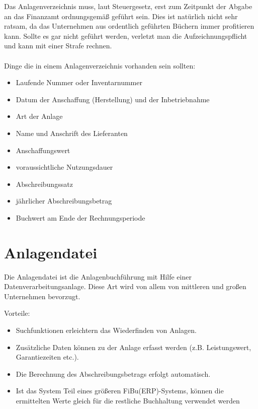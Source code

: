 \documentclass[a4paper,10pt]{report}
\begin{document}
Das Anlagenverzeichnis muss, laut Steuergesetz, erst zum Zeitpunkt der
Abgabe an das Finanzamt ordnungsgemäß geführt sein. Dies ist natürlich
nicht sehr ratsam, da das Unternehmen aus ordentlich geführten Büchern
immer profitieren kann. Sollte es gar nicht geführt werden, verletzt
man die Aufzeichnungspflicht und kann mit einer Strafe rechnen.
\\\\
Dinge die in einem Anlagenverzeichnis vorhanden sein sollten:
\begin{multicols}{2}
  \begin{itemize}
    \item Laufende Nummer oder Inventarnummer
    \item Datum der Anschaffung (Herstellung) und der Inbetriebnahme
    \item Art der Anlage
    \item Name und Anschrift des Lieferanten
    \item Anschaffungswert
    \item voraussichtliche Nutzungsdauer
    \item Abschreibungssatz
    \item jährlicher Abschreibungsbetrag
    \item Buchwert am Ende der Rechnungsperiode
  \end{itemize}
\end{multicols}

\section{Anlagendatei}
\label{sec:anlagendatei}
Die Anlagendatei ist die Anlagenbuchführung mit Hilfe einer
Datenverarbeitungsanlage. Diese Art wird von allem von mittleren und
großen Unternehmen bevorzugt.

Vorteile:
\begin{itemize}
  \item Suchfunktionen erleichtern das Wiederfinden von Anlagen.
  \item Zusätzliche Daten können zu der Anlage erfasst werden
(z.B. Leistungswert, Garantiezeiten etc.).
  \item Die Berechnung des Abschreibungsbetrags erfolgt automatisch.
  \item Ist das System Teil eines größeren FiBu(ERP)-Systems, können
die ermittelten Werte gleich für die restliche Buchhaltung verwendet
werden
\end{itemize}
\end{document}
